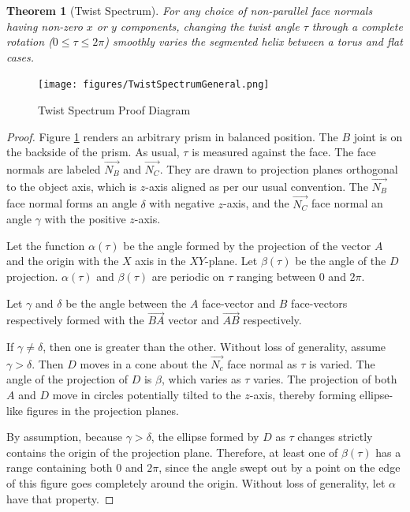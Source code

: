 \documentclass[11pt]{article}
\newtheorem{theorem}{Theorem}
\begin{document}
{\begin{theorem}[Twist Spectrum]
  For any choice of non-parallel face normals having non-zero $x$ or $y$ components,
  changing the twist angle $\tau$ through a complete rotation ($0 \leq \tau \leq 2\pi$)
  smoothly varies the segmented helix
  between a torus and flat cases.
\end{theorem}




\begin{figure}
     \centering
     \texttt{[image: figures/TwistSpectrumGeneral.png]}
     \caption{Twist Spectrum Proof Diagram}
  \label{fig:twistspectrum}
\end{figure}

\begin{proof}
  Figure \ref{fig:twistspectrum} renders an arbitrary
  prism in balanced position. The $B$ joint is on the backside of the
  prism. As usual, $\tau$ is measured against the
  face. The face normals are labeled $\overrightarrow{N_B}$ and $\overrightarrow{N_C}$.
  They are drawn
  to projection planes orthogonal to the object axis, which is $z$-axis
  aligned as per our usual convention. The $\overrightarrow{N_B}$ face normal forms
  an angle $\delta$ with negative $z$-axis, and the $\overrightarrow{N_C}$ face normal
  an angle $\gamma$ with the positive $z$-axis.

  Let the function $\alpha(\tau)$ be the angle formed by the
  projection of the vector $A$ and the origin with the $X$ axis in the $XY$-plane.
  Let $\beta(\tau)$ be the angle of the $D$ projection. $\alpha(\tau)$
  and $\beta(\tau)$ are periodic on $\tau$ ranging between $0$ and
  $2\pi$.

    Let $\gamma$ and $\delta$ be the angle between the $A$ face-vector and
    $B$ face-vectors respectively formed with the
    $\overrightarrow{BA}$ vector and $\overrightarrow{AB}$ respectively.

    If $\gamma \neq \delta$, then one is greater than the other.
    Without loss of generality, assume $\gamma > \delta$.
    Then $D$ moves in a cone
    about the $\overrightarrow{N_c}$ face normal as $\tau$ is varied. The
    angle of the projection of $D$ is $\beta$, which varies as $\tau$
    varies.
    The projection of both $A$ and $D$ move in circles
    potentially tilted to the $z$-axis, thereby
    forming ellipse-like figures in the projection planes.

    By assumption, because $\gamma > \delta$, the
    ellipse formed by $D$ as $\tau$ changes
    strictly contains the origin of the projection plane.
    Therefore, at least one of $\beta(\tau)$  has a range
    containing both $0$ and $2\pi$, since the angle swept out by
    a point on the edge of this figure goes completely around the origin.
    Without loss of generality, let $\alpha$ have that property.


\end{proof}}
\end{document}
